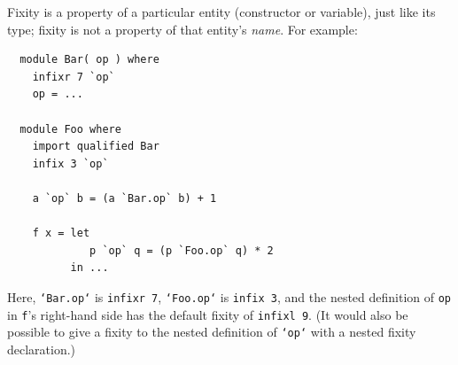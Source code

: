 
Fixity is a property of a particular entity (constructor or variable), just like
its type; fixity is not a property of that entity's {\em name}.
For example: 
\bprog
{\small\begin{verbatim}
  module Bar( op ) where
    infixr 7 `op`
    op = ...
  
  module Foo where
    import qualified Bar
    infix 3 `op`
  
    a `op` b = (a `Bar.op` b) + 1
  
    f x = let
             p `op` q = (p `Foo.op` q) * 2
          in ...
\end{verbatim}}
\eprog
Here, \mbox{\tt `Bar.op`} is \mbox{\tt infixr\ 7}, \mbox{\tt `Foo.op`} is \mbox{\tt infix\ 3}, and
the nested definition of \mbox{\tt op} in \mbox{\tt f}'s right-hand side has the
default fixity of \mbox{\tt infixl\ 9}.  (It would also be possible
to give a fixity to the nested definition of \mbox{\tt `op`} with a nested
fixity declaration.)



